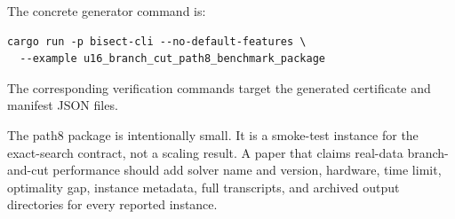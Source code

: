 The concrete generator command is:
\begin{verbatim}
cargo run -p bisect-cli --no-default-features \
  --example u16_branch_cut_path8_benchmark_package
\end{verbatim}
The corresponding verification commands target the generated certificate and
manifest JSON files.

The path8 package is intentionally small. It is a smoke-test instance for the
exact-search contract, not a scaling result. A paper that claims real-data
branch-and-cut performance should add solver name and version, hardware, time
limit, optimality gap, instance metadata, full transcripts, and archived output
directories for every reported instance.
